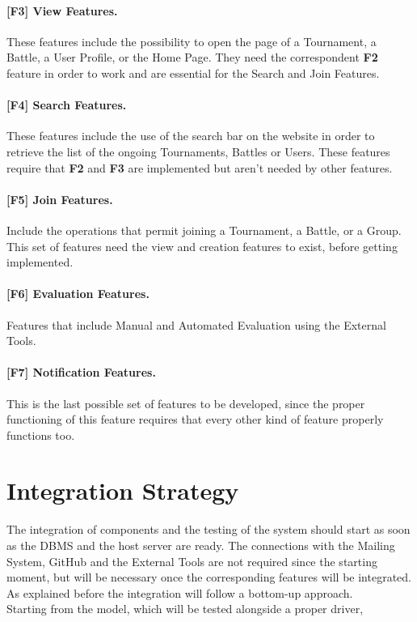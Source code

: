 \paragraph{[F3] View Features.} These features include the possibility to open the page of a Tournament, a Battle, a User Profile, or the Home Page. They need the correspondent \textbf{F2} feature in order to work and are essential for the Search and Join Features.

\paragraph{[F4] Search Features.} These features include the use of the search bar on the website in order to retrieve the list of the ongoing Tournaments, Battles or Users. These features require that \textbf{F2} and \textbf{F3} are implemented but aren’t needed by other features.

\paragraph{[F5] Join Features.} Include the operations that permit joining a Tournament, a Battle, or a Group. This set of features need the view and creation features to exist, before getting implemented.

\paragraph{[F6] Evaluation Features.} Features that include Manual and Automated Evaluation using the External Tools. 

\paragraph{[F7] Notification Features.} This is the last possible set of features to be developed, since the proper functioning of this feature requires that every other kind of feature properly functions too.  

\newpage
\section{Integration Strategy}
The integration of components and the testing of the system should start as soon as the DBMS and the host server are ready. The connections with the Mailing System, GitHub and the External Tools are not required since the starting moment, but will be necessary once the corresponding features will be integrated. As explained before the integration will follow a bottom-up approach.
\\
Starting from the model, which will be tested alongside a proper driver, 


